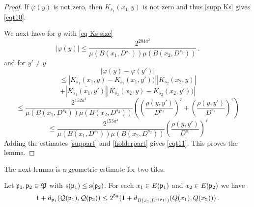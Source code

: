 \begin{proof}

If $\varphi(y)$ is not zero, then $K_{s_1}(x_1, y)$ is not zero and thus
\eqref{supp Ks} gives \eqref{eqt10}.

We next have for $y$ with \eqref{eq Ks size}
\begin{equation}\label{suppart}
    |\varphi(y)|\le
    \frac{2^{204 a^3}}{\mu(B(x_1, D^{s_1}))\mu(B(x_2, D^{s_2}))}\, .
\end{equation}
and for $y'\neq y$
\begin{equation}
    |\varphi(y)-\varphi(y')|
    \end{equation}
    \begin{equation}
    \le
    |K_{s_1}(x_1,y)-K_{s_1}(x_1,y'))||
    K_{s_2}(x_2, y)|
\end{equation}
    \begin{equation}+| \overline{K_{s_1}(x_1, y')}|
    |K_{s_2}(x_2, y) - K_{s_2}(x_2, y'))|
\end{equation}
\begin{equation}
        \le \frac{2^{152 a^3}}{\mu(B(x_1, D^{s_1}))\mu(B(x_2, D^{s_2}))}
        \left(\left(\frac{ \rho(y,y')}{D^{s_1}}\right)^{\tau}+
        \left(\frac{ \rho(y,y')}{D^{s_2}}\right)^{\tau}\right)
\end{equation}
\begin{equation}\label{holderpart}
        \le \frac{2^{153 a^3}}{\mu(B(x_1, D^{s_1}))\mu(B(x_2, D^{s_2}))}
        \left(\frac{ \rho(y,y')}{D^{s_1}}\right)^{\tau}
\end{equation}
Adding the estimates \eqref{suppart} and \eqref{holderpart} gives \eqref{eqt11}.
This proves the lemma.
\end{proof}
The next lemma is a geometric estimate for two tiles.
\begin{lemma}\label{lem tgeo}
    Let $\mathfrak p_1, \mathfrak p_2\in \mathfrak P$ with
$\mathrm{s}({\mathfrak p_1})\leq \mathrm{s}({\mathfrak p_2})$. For each $x_1\in E(\mathfrak p_1)$ and
$x_2\in E(\mathfrak p_2)$  we have
\begin{equation}\label{tgeo}
    1+d_{\mathfrak p_1}(\mathcal{Q}(\mathfrak p_1), \mathcal{Q}(\mathfrak p_2))\le
    2^{5a}(1 + d_{B(x_1, D^{\mathrm{s}(\mathfrak p_1)})}({Q}(x_1),{Q}(x_2)))\, .
\end{equation}
\end{lemma}
